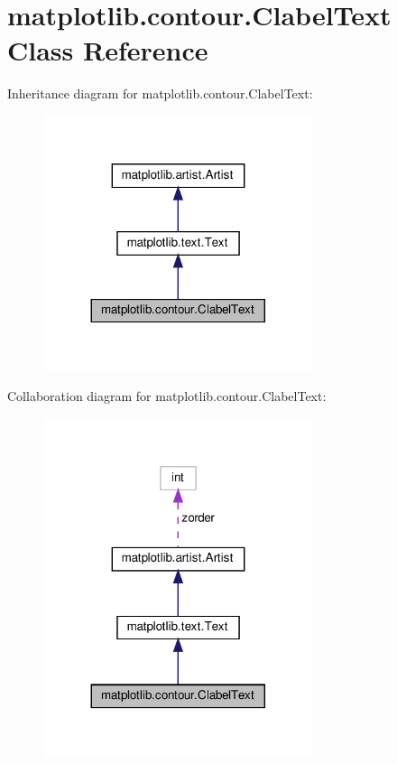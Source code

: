 \hypertarget{classmatplotlib_1_1contour_1_1ClabelText}{}\section{matplotlib.\+contour.\+Clabel\+Text Class Reference}
\label{classmatplotlib_1_1contour_1_1ClabelText}


Inheritance diagram for matplotlib.\+contour.\+Clabel\+Text\+:
\nopagebreak
\begin{figure}[H]
\begin{center}
\leavevmode
\includegraphics[width=224pt]{classmatplotlib_1_1contour_1_1ClabelText__inherit__graph}
\end{center}
\end{figure}


Collaboration diagram for matplotlib.\+contour.\+Clabel\+Text\+:
\nopagebreak
\begin{figure}[H]
\begin{center}
\leavevmode
\includegraphics[width=224pt]{classmatplotlib_1_1contour_1_1ClabelText__coll__graph}
\end{center}
\end{figure}

